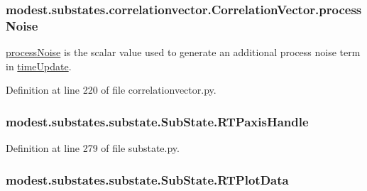 \subsubsection[{\texorpdfstring{process\+Noise}{processNoise}}]{\setlength{\rightskip}{0pt plus 5cm}modest.\+substates.\+correlationvector.\+Correlation\+Vector.\+process\+Noise}\hypertarget{classmodest_1_1substates_1_1correlationvector_1_1CorrelationVector_ab1756128cdec161ea22557d756745195}{}\label{classmodest_1_1substates_1_1correlationvector_1_1CorrelationVector_ab1756128cdec161ea22557d756745195}


\hyperlink{classmodest_1_1substates_1_1correlationvector_1_1CorrelationVector_ab1756128cdec161ea22557d756745195}{process\+Noise} is the scalar value used to generate an additional process noise term in \hyperlink{classmodest_1_1substates_1_1correlationvector_1_1CorrelationVector_a59c13e5fa26ba27717494f687ec78ef8}{time\+Update}. 



Definition at line 220 of file correlationvector.\+py.

\subsubsection[{\texorpdfstring{R\+T\+Paxis\+Handle}{RTPaxisHandle}}]{\setlength{\rightskip}{0pt plus 5cm}modest.\+substates.\+substate.\+Sub\+State.\+R\+T\+Paxis\+Handle\hspace{0.3cm}{\ttfamily [inherited]}}\hypertarget{classmodest_1_1substates_1_1substate_1_1SubState_a497ccbb6658589b02568e87c6382222e}{}\label{classmodest_1_1substates_1_1substate_1_1SubState_a497ccbb6658589b02568e87c6382222e}


Definition at line 279 of file substate.\+py.

\subsubsection[{\texorpdfstring{R\+T\+Plot\+Data}{RTPlotData}}]{\setlength{\rightskip}{0pt plus 5cm}modest.\+substates.\+substate.\+Sub\+State.\+R\+T\+Plot\+Data\hspace{0.3cm}{\ttfamily [inherited]}}\hypertarget{classmodest_1_1substates_1_1substate_1_1SubState_a9fefae1facc797a1132fb61a55e9ffa1}{}\label{classmodest_1_1substates_1_1substate_1_1SubState_a9fefae1facc797a1132fb61a55e9ffa1}


